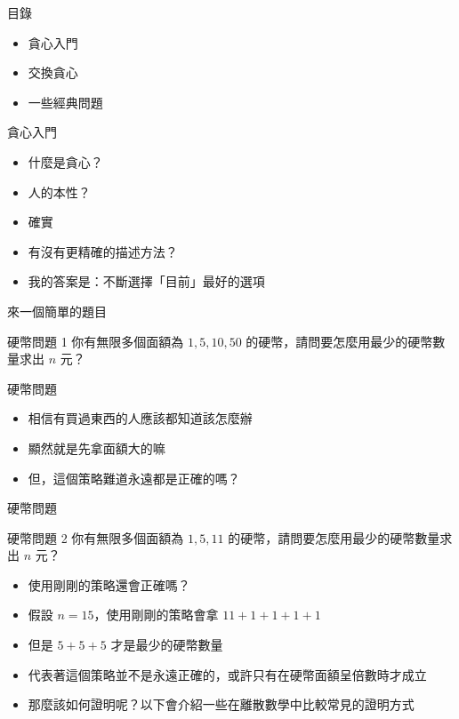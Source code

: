 \documentclass[aspectratio=169]{beamer}
\begin{document}
    \begin{frame}{目錄}
        \begin{itemize}
            \item 貪心入門
            \item 交換貪心
            \item 一些經典問題
        \end{itemize}
    \end{frame}

    \begin{frame}{貪心入門}
        \begin{itemize}
            \item<1-> 什麼是貪心？
            \item<2-> 人的本性？
            \item<3-> 確實
            \item<4-> 有沒有更精確的描述方法？
            \item<5-> 我的答案是：不斷選擇「目前」最好的選項
        \end{itemize}
    \end{frame}

    \begin{frame}{來一個簡單的題目}
        \begin{block}{硬幣問題 1}
            你有無限多個面額為 $1, 5, 10, 50$ 的硬幣，請問要怎麼用最少的硬幣數量求出 $n$ 元？
        \end{block}
    \end{frame}

    \begin{frame}{硬幣問題}
        \begin{itemize}
            \item<1-> 相信有買過東西的人應該都知道該怎麼辦
            \item<1-> 顯然就是先拿面額大的嘛
            \item<2-> 但，這個策略難道永遠都是正確的嗎？
        \end{itemize}
    \end{frame}

    \begin{frame}{硬幣問題}
        \begin{block}{硬幣問題 2}
            你有無限多個面額為 $1, 5, 11$ 的硬幣，請問要怎麼用最少的硬幣數量求出 $n$ 元？
        \end{block}

        \begin{itemize}
            \item<1-> 使用剛剛的策略還會正確嗎？
            \item<2-> 假設 $n = 15$，使用剛剛的策略會拿 $11 + 1 + 1 + 1 + 1$
            \item<2-> 但是 $5 + 5 + 5$ 才是最少的硬幣數量
            \item<3-> 代表著這個策略並不是永遠正確的，或許只有在硬幣面額呈倍數時才成立
            \item<4-> 那麼該如何證明呢？以下會介紹一些在離散數學中比較常見的證明方式
        \end{itemize}
    \end{frame}
\end{document}
